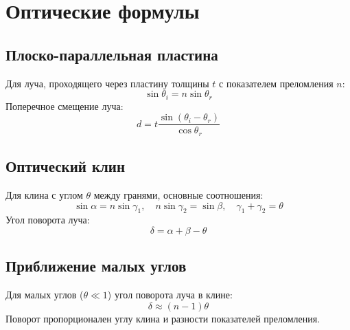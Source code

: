 \documentclass{article}
\begin{document}
\section*{Оптические формулы}

\subsection*{Плоско-параллельная пластина}
Для луча, проходящего через пластину толщины $t$ с показателем преломления $n$:
\[\sin \theta_i = n \sin \theta_r\]
Поперечное смещение луча:
\[d = t \frac{\sin(\theta_i - \theta_r)}{\cos \theta_r}\]

\subsection*{Оптический клин}
Для клина с углом $\theta$ между гранями, основные соотношения:
\[\sin \alpha = n \sin \gamma_1, \quad n \sin \gamma_2 = \sin \beta, \quad \gamma_1 + \gamma_2 = \theta\]
Угол поворота луча:
\[\delta = \alpha + \beta - \theta\]

\subsection*{Приближение малых углов}
Для малых углов ($\theta \ll 1$) угол поворота луча в клине:
\[\delta \approx (n - 1)\theta\]
Поворот пропорционален углу клина и разности показателей преломления.
\end{document}

